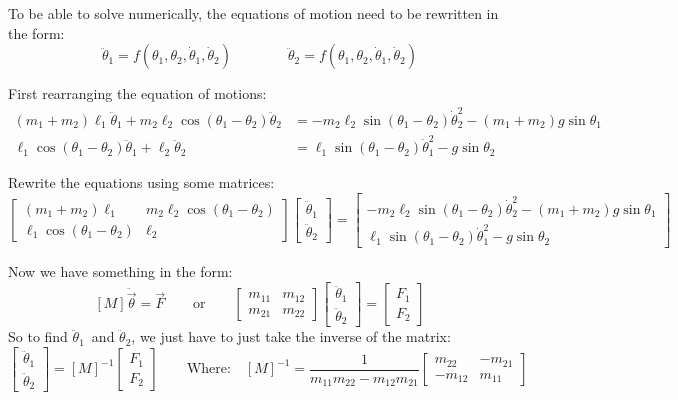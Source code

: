 \documentclass[letterpaper,8pt]{article}
\begin{document}
To be able to solve numerically, the equations of motion need to be rewritten in the form:
\[
\ddot{\theta}_1 = f (\theta_1, \theta_2, \dot{\theta}_1, \dot{\theta}_2)
\qquad\qquad
\ddot{\theta}_2 = f (\theta_1, \theta_2, \dot{\theta}_1, \dot{\theta}_2)
\]

First rearranging the equation of motions:
\begin{align*}
(m_1 + m_2)\ell_1 \ddot{\theta}_1 + m_2 \ell_2 \cos (\theta_1 - \theta_2) \ddot{\theta}_2 &=
          - m_2\ell_2 \sin (\theta_1 - \theta_2) \dot{\theta}_2^2 - (m_1 + m_2) g \sin \theta_1  \\
\ell_1 \cos(\theta_1 - \theta_2) \ddot{\theta}_1 + \ell_2 \ddot{\theta}_2 &=
           \ell_1 \sin (\theta_1 - \theta_2) \dot{\theta}_1^2 - g \sin \theta_2 
\end{align*}

Rewrite the equations using some matrices:
\[
\left[
\begin{array}{cc}
(m_1 + m_2)\ell_1 & m_2 \ell_2 \cos (\theta_1 - \theta_2) \\
\ell_1 \cos(\theta_1 - \theta_2) & \ell_2 
\end{array}
\right]
\left[
\begin{array}{c}
\ddot{\theta}_1 \\
\ddot{\theta}_2
\end{array}
\right]
= 
\left[
\begin{array}{c}
- m_2\ell_2 \sin (\theta_1 - \theta_2) \dot{\theta}_2^2 - (m_1 + m_2) g \sin \theta_1 \\
\ell_1 \sin (\theta_1 - \theta_2) \dot{\theta}_1^2 - g \sin \theta_2
\end{array}
\right]
\]

Now we have something in the form:
\[
[M] \ddot{\vec{\theta}} = \vec{F}
\qquad \text{or} \qquad
\left[
\begin{array}{cc}
m_{11} & m_{12} \\
m_{21} & m_{22}
\end{array}
\right]
\left[
\begin{array}{c}
\ddot{\theta}_1 \\
\ddot{\theta}_2
\end{array}
\right]
=
\left[
\begin{array}{c}
F_1 \\
F_2
\end{array}
\right]
\]
So to find $\ddot{\theta}_1$\ and $\ddot{\theta}_2$, we just have to just take the inverse of the matrix:
\[
\left[
\begin{array}{c}
\ddot{\theta}_1 \\
\ddot{\theta}_2
\end{array}
\right]
=
[M]^{-1} 
\left[
\begin{array}{c}
F_1 \\
F_2
\end{array}
\right]
\qquad
\text{Where:}
\quad
[M]^{-1} = 
\frac{1}{m_{11}m_{22} - m_{12}m_{21}}
\left[
\begin{array}{cc}
 m_{22} & -m_{21} \\
-m_{12} &  m_{11}
\end{array}
\right]
\]
\end{document}
